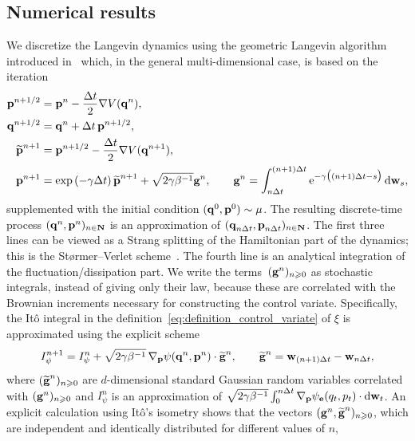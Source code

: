 \documentclass[11pt,a4paper]{article}
\begin{document}
\subsection{Numerical results}%
\label{sub:numerical_results}
We discretize the Langevin dynamics using the geometric Langevin algorithm introduced in~\cite{MR2608370} which,
in the general multi-dimensional case, is based on the iteration
\begin{align*}
    \boldsymbol{\mathbf p}^{n+1/2}
    &= \boldsymbol{\mathbf p}^n - \frac{\Delta t}{2} \nabla V(\boldsymbol{\mathbf q}^n), \\
    \boldsymbol{\mathbf q}^{n+1/2}
    &= \boldsymbol{\mathbf q}^n + \Delta t \, \boldsymbol{\mathbf p}^{n+1/2}, \\
    \widetilde {\boldsymbol{\mathbf p}}^{n+1}
    &= \boldsymbol{\mathbf p}^{n+1/2} - \frac{\Delta t}{2} \nabla V(\boldsymbol{\mathbf q}^{n+1}), \\
    \boldsymbol{\mathbf p}^{n+1} &= \exp \left(- \gamma \Delta t \right) \widetilde {\boldsymbol{\mathbf p}}^{n+1}
    + \sqrt{2 \gamma \beta^{-1}} \boldsymbol{\mathbf g}^n, \qquad \boldsymbol{\mathbf g}^n = \int_{n \Delta t}^{(n+1)\Delta t} \mathrm{e}^{-\gamma \bigl((n+1)\Delta t-s\bigr)} \, \mathrm d \boldsymbol{\mathbf w}_s,
\end{align*}
supplemented with the initial condition $(\boldsymbol{\mathbf q}^0, \boldsymbol{\mathbf p}^0) \sim \mu$.
The resulting discrete-time process $(\boldsymbol{\mathbf q}^n, \boldsymbol{\mathbf p}^n)_{n \in \mathbf N}$ is an approximation of $(\boldsymbol{\mathbf q}_{n \Delta t}, \boldsymbol{\mathbf p}_{n \Delta t})_{n \in \mathbf N}$.
The first three lines can be viewed as a Strang splitting of the Hamiltonian part of the dynamics;
this is the St\o rmer--Verlet scheme~\cite{verlet1967computer}.
The fourth line is an analytical integration of the fluctuation/dissipation part.
We write the terms~$(\boldsymbol{\mathbf g}^n)_{n\geqslant0}$ as stochastic integrals, instead of giving only their law,
because these are correlated with the Brownian increments necessary for constructing the control variate.
Specifically, the It\^o integral in the definition~\eqref{eq:definition_control_variate} of $\xi$ is approximated using the explicit scheme
\[
    I_{\psi}^{n+1} = I_{\psi}^n + \sqrt{2 \gamma \beta^{-1}} \, \nabla_{\boldsymbol{\mathbf p}} \psi(\boldsymbol{\mathbf q}^{n}, \boldsymbol{\mathbf p}^{n}) \cdot
    \widetilde {\boldsymbol{\mathbf g}}^n, \qquad \widetilde {\boldsymbol{\mathbf g}}^n = \boldsymbol{\mathbf w}_{(n+1)\Delta t} - \boldsymbol{\mathbf w}_{n \Delta t},
\]
where $(\widetilde {\boldsymbol{\mathbf g}}^n)_{n \geqslant 0}$ are $d$-dimensional standard Gaussian random variables correlated with $(\boldsymbol{\mathbf g}^n)_{n \geqslant 0}$
and $I_{\psi}^{n}$ is an approximation of $\sqrt{2 \gamma \beta^{-1}} \int_{0}^{n \Delta t} \nabla_{\boldsymbol{\mathbf p}} \psi_{\boldsymbol{\mathbf e}}(q_t, p_t) \cdot \mathrm d \boldsymbol{\mathbf w}_t$.
An explicit calculation using It\^o's isometry shows that the vectors $(\boldsymbol{\mathbf g}^n, \widetilde {\boldsymbol{\mathbf g}}^n)_{n \geqslant 0}$,
which are independent and identically distributed for different values of $n$,
\end{document}
